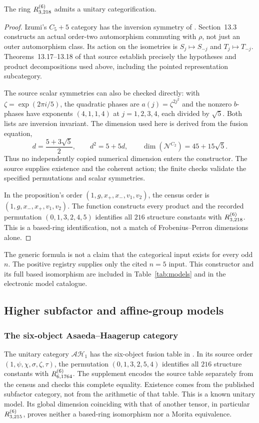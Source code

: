 \begin{corollary}\label{cor:inversion-five}
The ring $R^{(6)}_{3,218}$ admits a unitary categorification.
\end{corollary}
\begin{proof}
Izumi's $C_5+5$ category has the inversion symmetry of
\cite[Example~13.8]{Izumi}. Section~13.3 constructs an actual order-two
automorphism commuting with $\rho$, not just an outer automorphism
class. Its action on the isometries is $S_j\mapsto S_{-j}$ and
$T_j\mapsto T_{-j}$. Theorems~13.17--13.18 of that source establish
precisely the hypotheses and product decompositions used above,
including the pointed representation subcategory.

The source scalar symmetries can also be checked directly: with
$\zeta=\exp(2\pi i/5)$, the quadratic phases are
$a(j)=\zeta^{2j^2}$ and the nonzero $b$-phases have exponents
$(4,1,1,4)$ at $j=1,2,3,4$, each divided by $\sqrt5$.
Both lists are inversion invariant. The dimension used here is derived
from the fusion equation,
\[
 d=\frac{5+3\sqrt5}{2},\qquad d^2=5+5d,
 \qquad\dim(\mathcal N^{C_2})=45+15\sqrt5.
\]
Thus no independently copied numerical dimension enters the constructor.
The source supplies existence and the coherent action; the finite
checks validate the specified permutations and scalar symmetries.

In the proposition's order $(1,g,x_+,x_-,v_1,v_2)$, the census order is
$(1,g,x_-,x_+,v_1,v_2)$. The function
 constructs every product and the recorded
permutation $(0,1,3,2,4,5)$ identifies all $216$ structure constants with
$R^{(6)}_{3,218}$. This is a based-ring identification, not a match of
Frobenius--Perron dimensions alone.
\end{proof}

The generic formula is not a claim that the categorical input exists
for every odd $n$. The positive registry supplies only the cited $n=5$
input. This constructor and its full based isomorphism are included in
Table~\ref{tab:models} and in the electronic model catalogue.

\subsection{Higher subfactor and affine-group models}\label{sec:through7-models}
\subsubsection{The six-object Asaeda--Haagerup category}
The unitary category $\mathcal{AH}_1$ has the six-object fusion table
in \cite[Table~1]{GSAH}. In its source order
$(1,\psi,\chi,\sigma,\zeta,\tau)$, the permutation
$(0,1,3,2,5,4)$ identifies all $216$ structure constants with
$R^{(6)}_{6,1764}$. The supplement encodes the source table separately from
the census and checks this complete equality. Existence comes from the
published subfactor category, not from the arithmetic of that table.
This is a known unitary model. Its global dimension coinciding with
that of another tensor, in particular $R^{(6)}_{3,215}$, proves neither a
based-ring isomorphism nor a Morita equivalence.


